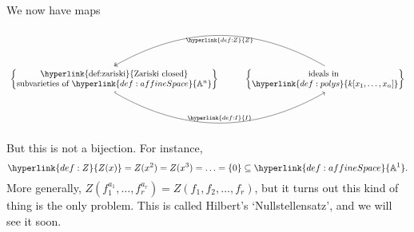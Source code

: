 \documentclass{article}
\newcommand{\A}{\mathbb{A}}
\begin{document}
We now have maps
\begin{equation*}
    \begin{tikzcd}
    \begin{Bmatrix}
        \text{\hyperlink{def:zariski}{Zariski closed}} \\
        \text{subvarieties of } \hyperlink{def:affineSpace}{\A^n}
    \end{Bmatrix}
    \ar[r, bend right, hookrightarrow, "\hyperlink{def:I}{I}", start anchor=south, end anchor=south]&
    \begin{Bmatrix}
        \text{ideals in } \\
        \hyperlink{def:polys}{k[x_1, \dotsc, x_n]}
    \end{Bmatrix}
    \ar[l, bend right, two heads, "\hyperlink{def:Z}{Z}", start anchor=north, end anchor=north]
\end{tikzcd}
\end{equation*}
But this is not a bijection. For instance,
\begin{equation*}\hyperlink{def:Z}{Z(x)} = Z(x^2) = Z(x^3) = \dotsc = \{0\} \subseteq \hyperlink{def:affineSpace}{\A^1}.\end{equation*}
More generally,
$Z( f_1^{a_1}, \dotsc, f_r^{a_r}) = Z(f_1, f_2, \dotsc, f_r)$,
but it turns out this kind of thing is the only problem.
This is called Hilbert's `Nullstellensatz', and we will see it soon.
\end{document}
